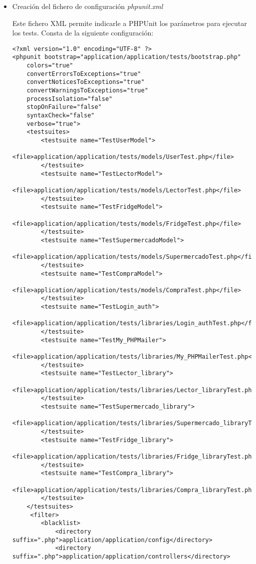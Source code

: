 \begin{itemize}
    \item Creación del fichero de configuración \emph{phpunit.xml}

        Este fichero XML permite indicarle a PHPUnit los parámetros para ejecutar los tests. Consta de la siguiente configuración:

                \begin{lstlisting}
<?xml version="1.0" encoding="UTF-8" ?>
<phpunit bootstrap="application/application/tests/bootstrap.php"
    colors="true"
    convertErrorsToExceptions="true"
    convertNoticesToExceptions="true"
    convertWarningsToExceptions="true"
    processIsolation="false"
    stopOnFailure="false"
    syntaxCheck="false"
    verbose="true">
    <testsuites>
        <testsuite name="TestUserModel">
            <file>application/application/tests/models/UserTest.php</file>
        </testsuite>
        <testsuite name="TestLectorModel">
            <file>application/application/tests/models/LectorTest.php</file>
        </testsuite>
        <testsuite name="TestFridgeModel">
            <file>application/application/tests/models/FridgeTest.php</file>
        </testsuite>
        <testsuite name="TestSupermercadoModel">
            <file>application/application/tests/models/SupermercadoTest.php</file>
        </testsuite>
        <testsuite name="TestCompraModel">
            <file>application/application/tests/models/CompraTest.php</file>
        </testsuite>
        <testsuite name="TestLogin_auth">
            <file>application/application/tests/libraries/Login_authTest.php</file>
        </testsuite>
        <testsuite name="TestMy_PHPMailer">
            <file>application/application/tests/libraries/My_PHPMailerTest.php</file>
        </testsuite>
        <testsuite name="TestLector_library">
            <file>application/application/tests/libraries/Lector_libraryTest.php</file>
        </testsuite>
        <testsuite name="TestSupermercado_library">
            <file>application/application/tests/libraries/Supermercado_libraryTest.php</file>
        </testsuite>
        <testsuite name="TestFridge_library">
            <file>application/application/tests/libraries/Fridge_libraryTest.php</file>
        </testsuite>
        <testsuite name="TestCompra_library">
            <file>application/application/tests/libraries/Compra_libraryTest.php</file>
        </testsuite>
    </testsuites>
     <filter>
        <blacklist>
            <directory suffix=".php">application/application/config</directory>
            <directory suffix=".php">application/application/controllers</directory>

\end{lstlisting}
\end{itemize}
